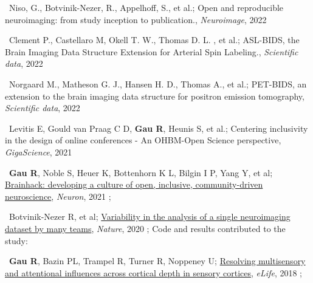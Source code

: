 


\textbullet~Niso, G., Botvinik-Nezer, R., Appelhoff, S., et al.;
Open and reproducible neuroimaging: from study inception to publication.,
\textit{Neuroimage},
2022
\newline
{}

\textbullet~Clement P., Castellaro M, Okell T. W., Thomas D. L. , et al.;
ASL-BIDS, the Brain Imaging Data Structure Extension for Arterial Spin Labeling.,
\textit{Scientific data},
2022
\newline
{}

\textbullet~Norgaard M., Matheson G. J., Hansen H. D., Thomas A., et al.;
PET-BIDS, an extension to the brain imaging data structure for positron emission tomography,
\textit{Scientific data},
2022
\newline
{}

\textbullet~Levitis E, Gould van Praag C D, \textbf{Gau R}, Heunis S, et al.;
Centering inclusivity in the design of online conferences - An OHBM-Open Science perspective,
\textit{GigaScience},
2021
\newline
{}

\textbullet~\textbf{Gau R}, Noble S, Heuer K, Bottenhorn K L, Bilgin I P, Yang Y, et al;
\href{https://doi.org/10.1016/j.neuron.2021.04.001}{Brainhack: developing a culture of open, inclusive, community-driven neuroscience},
\textit{Neuron},
2021
\newline
{};

\textbullet~Botvinik-Nezer R, et al;
\href{https://osf.io/zac8t/}{Variability in the analysis of a single neuroimaging dataset by many teams},
\textit{Nature},
2020
\newline
{};
Code and results contributed to the study:

\smallskip

\textbullet~\textbf{Gau R}, Bazin PL, Trampel R, Turner R, Noppeney U;
\href{https://osf.io/x3uak/}{Resolving multisensory and attentional influences across cortical depth in sensory cortices},
\textit{eLife},
2018
\newline
{};

